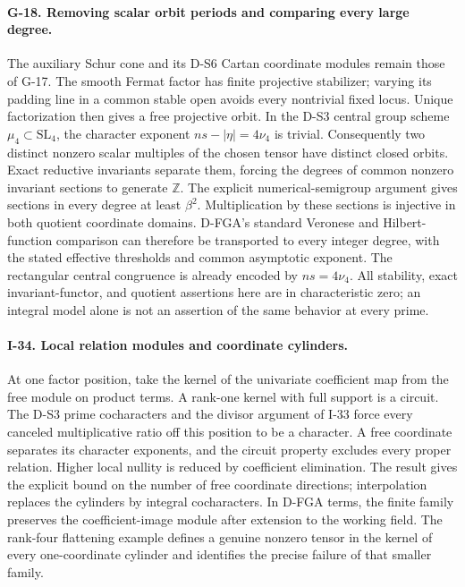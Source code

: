 \documentclass[11pt,a4paper]{article}
\theoremstyle{definition}\newtheorem{definition}{Definition}
\begin{document}
\paragraph{G-18. Removing scalar orbit periods and comparing every large degree.}
The auxiliary Schur cone and its D-S6 Cartan coordinate modules remain
those of G-17. The smooth Fermat factor has finite projective stabilizer;
varying its padding line in a common stable open avoids every nontrivial
fixed locus. Unique factorization then gives a free projective orbit.
In the D-S3 central group scheme $\mu_4\subset\mathrm{SL}_4$, the
character exponent $ns-|\eta|=4\nu_4$ is trivial. Consequently two
distinct nonzero scalar multiples of the chosen tensor have distinct
closed orbits. Exact reductive invariants separate them, forcing the
degrees of common nonzero invariant sections to generate $\mathbb Z$.
The explicit numerical-semigroup argument gives sections in every
degree at least $\beta^2$. Multiplication by these sections is injective
in both quotient coordinate domains. D-FGA's standard Veronese and
Hilbert-function comparison can therefore be transported to every
integer degree, with the stated effective thresholds and common
asymptotic exponent. The rectangular central congruence is already
encoded by $ns=4\nu_4$. All stability, exact invariant-functor, and
quotient assertions here are in characteristic zero; an integral
model alone is not an assertion of the same behavior at every prime.

\paragraph{I-34. Local relation modules and coordinate cylinders.}
At one factor position, take the kernel of the univariate coefficient
map from the free module on product terms. A rank-one kernel with full
support is a circuit. The D-S3 prime cocharacters and the divisor
argument of I-33 force every canceled multiplicative ratio off this
position to be a character. A free coordinate separates its character
exponents, and the circuit property excludes every proper relation.
Higher local nullity is reduced by coefficient elimination. The result
gives the explicit bound on the number of free coordinate directions;
interpolation replaces the cylinders by integral cocharacters. In
D-FGA terms, the finite family preserves the coefficient-image module
after extension to the working field. The rank-four flattening example
defines a genuine nonzero tensor in the kernel of every one-coordinate
cylinder and identifies the precise failure of that smaller family.
\end{document}
